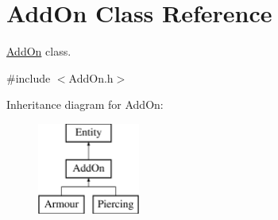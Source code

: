 \hypertarget{classAddOn}{}\section{Add\+On Class Reference}
\label{classAddOn}


\hyperlink{classAddOn}{Add\+On} class.  




{\ttfamily \#include $<$Add\+On.\+h$>$}

Inheritance diagram for Add\+On\+:\begin{figure}[H]
\begin{center}
\leavevmode
\includegraphics[height=3.000000cm]{classAddOn}
\end{center}
\end{figure}
